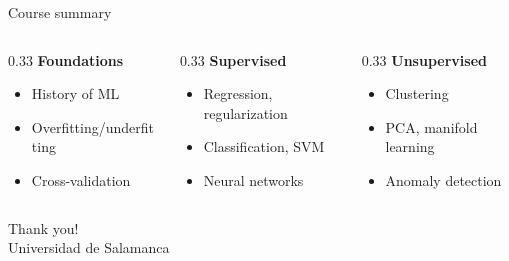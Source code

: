\documentclass[aspectratio=169]{beamer}
\begin{document}
\begin{frame}{Course summary}
  \begin{columns}
    \begin{column}{0.33\textwidth}
      \textbf{Foundations}
      \begin{itemize}
        \footnotesize
        \item History of ML
        \item Overfitting/underfitting
        \item Cross-validation
      \end{itemize}
    \end{column}
    \begin{column}{0.33\textwidth}
      \textbf{Supervised}
      \begin{itemize}
        \footnotesize
        \item Regression, regularization
        \item Classification, SVM
        \item Neural networks
      \end{itemize}
    \end{column}
    \begin{column}{0.33\textwidth}
      \textbf{Unsupervised}
      \begin{itemize}
        \footnotesize
        \item Clustering
        \item PCA, manifold learning
        \item Anomaly detection
      \end{itemize}
    \end{column}
  \end{columns}
\end{frame}

\begin{frame}
  \centering
  {\Huge Thank you!}\\[1em]
  {\large Universidad de Salamanca}
\end{frame}
\end{document}
